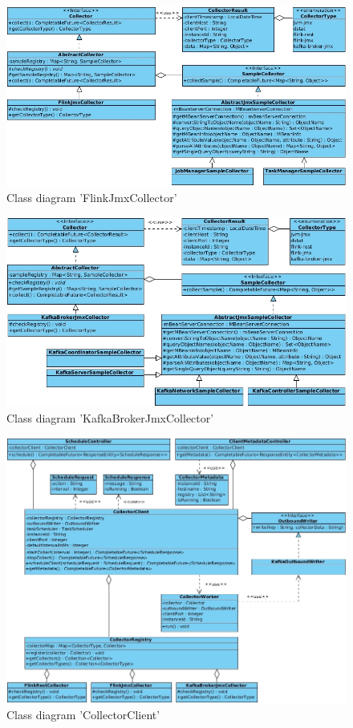 \begin{figure}[H]
	\centering
	\includegraphics[width=1.0\textwidth]{../uml/class-flink-jmx-collector.jpg}
	\caption{Class diagram 'FlinkJmxCollector'}
	\label{class-diagram-flink-jmx-collector}
\end{figure}
\begin{figure}[H]
	\centering
	\includegraphics[width=1.0\textwidth]{../uml/class-kafka-broker-jmx-collector.jpg}
	\caption{Class diagram 'KafkaBrokerJmxCollector'}
	\label{class-diagram-kafka-broker-jmx-collector}
\end{figure}
\begin{figure}[H]
	\centering
	\includegraphics[width=1.0\textwidth]{../uml/class-collector-client.jpg}
	\caption{Class diagram 'CollectorClient'}
	\label{class-diagram-collector-client}
\end{figure}
